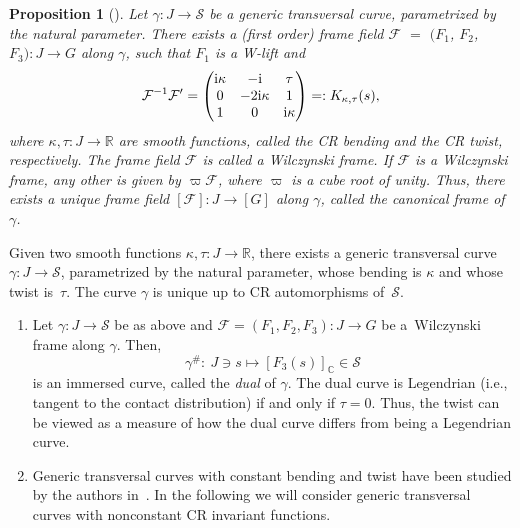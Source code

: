\documentclass[10pt,a4paper]{amsart}
\numberwithin{equation}{section}
\newtheorem{Proposition}[Theorem]{Proposition}
 { \theoremstyle{definition}
\newtheorem{Definition}[Theorem]{Definition}
\newtheorem{Note}[Theorem]{Note}
\newtheorem{Example}[Theorem]{Example}
\newtheorem{Remark}[Theorem]{Remark} }
\def\C{\mathbb{C}}
\def\R{\mathbb{R}}
\def\S{\mathcal{S}}
\def\F{\mathcal{F}}
\def\S{\mathcal{S}}
\begin{document}
\begin{Proposition}[\cite{MNS-Kharkiv}]\label{Prop-CF}
Let $\gamma \colon J \to\S$ be a generic transversal curve, pa\-ra\-me\-tri\-zed by the natural parameter. There exists a
(first order) frame field
$\F$ $=$ $(F_1$, $F_2$, $F_3) \colon J \to {G}$ along $\gamma$,
such that $F_1$ is a W-lift and
\begin{equation}\label{MCE-W-frame}
\F^{-1}\F'=
\begin{pmatrix}
{\rm i}\kappa & -{\rm i} & \tau\\
0 &-2{\rm i}\kappa & 1 \\
1 & 0&{\rm i}\kappa\\
 \end{pmatrix}
 = : K_{\kappa,\tau}(s),
 \end{equation}
where $\kappa, \tau \colon J \to \mathbb R$ are smooth functions, called the
\emph{CR bending}
and the \emph{CR twist}, respectively.
 The frame field $\F$ is called a {\em Wilczynski frame}.
If $\F$ is a Wilczynski frame, any other is given by $\varpi\F$,
where $\varpi$ is a cube root of unity.
Thus, there exists a unique frame
field $[\mathcal{F}] \colon J \to [G]$ along $\gamma$, called the {\em canonical frame} of $\gamma$.
\end{Proposition}

\begin{Remark}
Given two smooth functions $\kappa, \tau\colon J\to\R$, there exists a generic transversal
curve $\gamma\colon J\to\S$,
parametrized by the natural parameter,
whose bending is $\kappa$ and whose twist is~$\tau$.
The curve $\gamma$ is unique up to CR automorphisms of~$\S$.
\end{Remark}

\begin{Remark}\quad
\begin{enumerate}\itemsep=0pt
\item[$(1)$] Let $\gamma \colon J \to\S $ be as above and $\F = (F_1, F_2, F_3)\colon J \to {G}$ be a~Wilczynski frame
along $\gamma$. Then,
\[
 \gamma^\# \colon \ J \ni s\mapsto [F_3(s)]_\C\in\S
\]
is an immersed curve, called the \emph{dual} of $\gamma$.
The dual curve is Legendrian (i.e., tangent to the contact distribution)
if and only if $\tau = 0$. Thus, the twist can be viewed as a measure of how the dual curve differs
from being a Legendrian curve.

\item[$(2)$] Generic transversal curves with constant bending and twist have been studied by the authors in~\cite{MNS-Kharkiv}.
In the following we will consider generic transversal curves with nonconstant CR invariant functions.
\end{enumerate}
\end{Remark}
\end{document}
